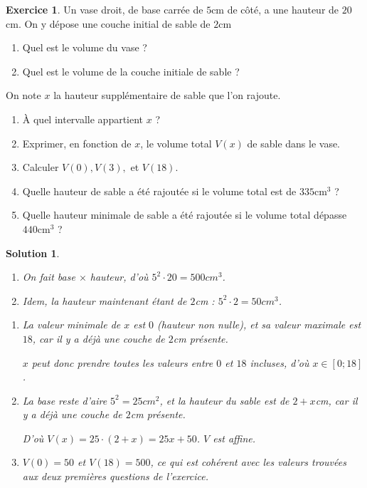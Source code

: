 \documentclass[12pt]{paper}
\theoremstyle{plain}
\newtheorem*{sol}{Solution}
\theoremstyle{definition}
\newtheorem{ex}{Exercice}
\newif\ifsolutions
\newcommand{\exe}[2]{
		\begin{ex} #1  \end{ex}
		\begin{sol} #2 \end{sol}
	}
\newcommand{\exe}[2]{
		\begin{ex} #1  \end{ex}
	}
\begin{document}
\pagestyle{fancy}
\fancyhead[C]{\textbf{Fonctions affines \ifsolutions -- Solutions \fi}}
\fancyhead[R]{\today}

\exe{
	Un vase droit, de base carrée de $5$cm de côté, a une hauteur de $20$cm.
	On y dépose une couche initial de sable de $2$cm
	
	\begin{enumerate}
		\item Quel est le volume du vase ?
		\item Quel est le volume de la couche initiale de sable ?
	\end{enumerate}
	
	On note $x$ la hauteur supplémentaire de sable que l'on rajoute.
	\begin{enumerate}
		\item À quel intervalle appartient $x$ ?
		\item Exprimer, en fonction de $x$, le volume total $V(x)$ de sable dans le vase.
		\item Calculer $V(0), V(3),$ et $V(18)$.
		\item Quelle hauteur de sable a été rajoutée si le volume total est de $335 \text{cm}^3$ ?
		\item Quelle hauteur minimale de sable a été rajoutée si le volume total dépasse $440 \text{cm}^3$ ?
	\end{enumerate}
}{
	\begin{enumerate}
		\item On fait base $\times$ hauteur, d'où $5^2 \cdot 20 = 500 cm^3$.
		\item Idem, la hauteur maintenant étant de $2$cm : $5^2 \cdot 2 = 50cm^3$.
	\end{enumerate}
	
	
	\begin{enumerate}
		\item La valeur minimale de $x$ est $0$ (hauteur non nulle), et sa valeur maximale est $18$, car il y a déjà une couche de $2$cm présente.
		
		$x$ peut donc prendre toutes les valeurs entre $0$ et $18$ incluses, d'où $x \in [0;18]$.
		\item La base reste d'aire $5^2 = 25cm^2$, et la hauteur du sable est de $2+x$cm, car il y a déjà une couche de $2$cm présente.
		
		D'où $V(x) = 25\cdot(2+x) = 25x + 50$.
		$V$ est affine.
		\item $V(0) = 50$ et $V(18) = 500$, ce qui est cohérent avec les valeurs trouvées aux deux premières questions de l'exercice.
		

\end{enumerate}}
\end{document}
